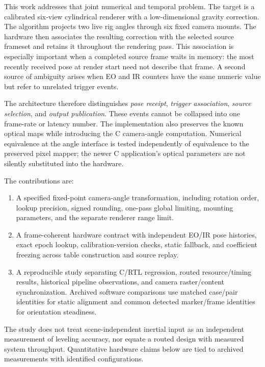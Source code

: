 \documentclass[journal]{IEEEtran}
\begin{document}
This work addresses that joint numerical and temporal problem. The target is a calibrated six-view cylindrical renderer with a low-dimensional gravity correction. The algorithm projects two live rig angles through six fixed camera mounts. The hardware then associates the resulting correction with the selected source frameset and retains it throughout the rendering pass. This association is especially important when a completed source frame waits in memory: the most recently received pose at render start need not describe that frame. A second source of ambiguity arises when EO and IR counters have the same numeric value but refer to unrelated trigger events.

The architecture therefore distinguishes \emph{pose receipt}, \emph{trigger association}, \emph{source selection}, and \emph{output publication}. These events cannot be collapsed into one frame-rate or latency number. The implementation also preserves the known optical maps while introducing the C camera-angle computation. Numerical equivalence at the angle interface is tested independently of equivalence to the preserved pixel mapper; the newer C application's optical parameters are not silently substituted into the hardware.

The contributions are:
\begin{enumerate}
\item A specified fixed-point camera-angle transformation, including rotation order, lookup precision, signed rounding, one-pass global limiting, mounting parameters, and the separate renderer range limit.
\item A frame-coherent hardware contract with independent EO/IR pose histories, exact epoch lookup, calibration-version checks, static fallback, and coefficient freezing across table construction and source replay.
\item A reproducible study separating C/RTL regression, routed resource/timing results, historical pipeline observations, and camera raster/content synchronization. Archived software comparisons use matched case/pair identities for static alignment and common detected marker/frame identities for orientation steadiness.
\end{enumerate}

The study does not treat scene-independent inertial input as an independent measurement of leveling accuracy, nor equate a routed design with measured system throughput. Quantitative hardware claims below are tied to archived measurements with identified configurations.
\end{document}
